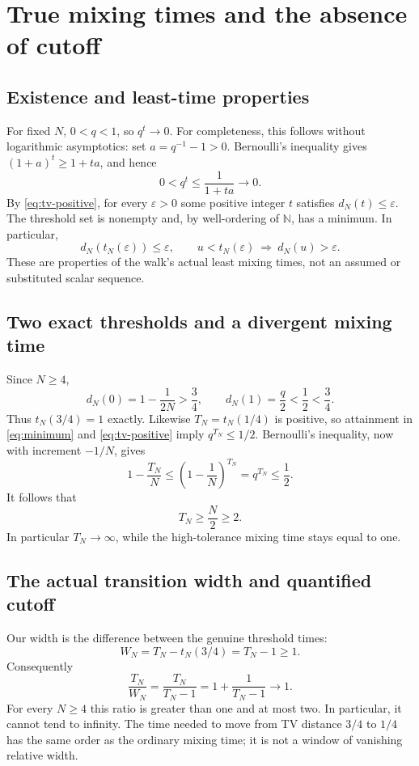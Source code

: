 \documentclass[11pt,a4paper]{article}
\theoremstyle{definition}
\theoremstyle{remark}
\newcommand{\N}{\mathbb N}
\begin{document}
\section{True mixing times and the absence of cutoff}

\subsection{Existence and least-time properties}

For fixed $N$, $0<q<1$, so $q^t\to0$. For completeness, this follows
without logarithmic asymptotics: set $a=q^{-1}-1>0$. Bernoulli's inequality
gives $(1+a)^t\ge1+ta$, and hence
\[
0<q^t\le\frac1{1+ta}\longrightarrow0.
\]
By \eqref{eq:tv-positive}, for every $\varepsilon>0$ some positive integer
$t$ satisfies $d_N(t)\le\varepsilon$. The threshold set is nonempty and,
by well-ordering of $\N$, has a minimum. In particular,
\begin{equation}\label{eq:minimum}
d_N(t_N(\varepsilon))\le\varepsilon,
\qquad u<t_N(\varepsilon)\ \Longrightarrow\ d_N(u)>\varepsilon.
\end{equation}
These are properties of the walk's actual least mixing times, not an
assumed or substituted scalar sequence.

\subsection{Two exact thresholds and a divergent mixing time}

Since $N\ge4$,
\[
d_N(0)=1-\frac1{2N}>\frac34,
\qquad d_N(1)=\frac q2<\frac12<\frac34.
\]
Thus $t_N(3/4)=1$ exactly. Likewise $T_N=t_N(1/4)$ is positive, so
attainment in \eqref{eq:minimum} and \eqref{eq:tv-positive} imply
$q^{T_N}\le1/2$. Bernoulli's inequality, now with increment $-1/N$, gives
\[
1-\frac{T_N}{N}\le\left(1-\frac1N\right)^{T_N}
=q^{T_N}\le\frac12.
\]
It follows that
\begin{equation}\label{eq:T-lower}
T_N\ge\frac N2\ge2.
\end{equation}
In particular $T_N\to\infty$, while the high-tolerance mixing time stays
equal to one.

\subsection{The actual transition width and quantified cutoff}

Our width is the difference between the genuine threshold times:
\[
W_N=T_N-t_N(3/4)=T_N-1\ge1.
\]
Consequently
\begin{equation}\label{eq:width-ratio}
\frac{T_N}{W_N}=\frac{T_N}{T_N-1}
=1+\frac1{T_N-1}\longrightarrow1.
\end{equation}
For every $N\ge4$ this ratio is greater than one and at most two. In
particular, it cannot tend to infinity. The time needed to move from TV
distance $3/4$ to $1/4$ has the same order as the ordinary mixing time;
it is not a window of vanishing relative width.
\end{document}
